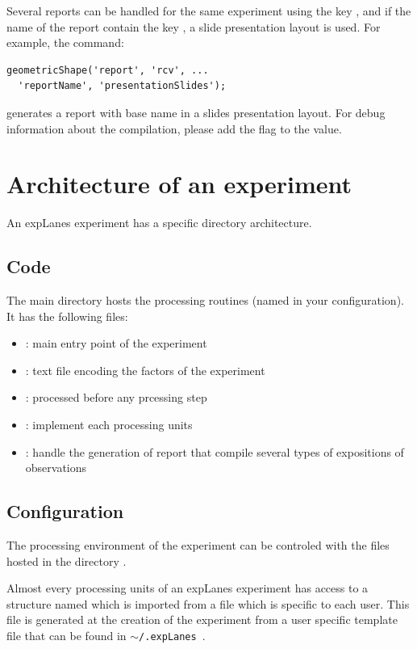 \documentclass[a4paper,fleqn]{tufte-handout}
\newcommand{\explanes}{\textsf{expLanes} }
\begin{document}
Several reports can be handled for the same experiment using the key , and if the name of the report contain the key , a slide presentation layout is used. For example, the command:
\begin{lstlisting}
geometricShape('report', 'rcv', ...
  'reportName', 'presentationSlides');
\end{lstlisting} 
generates a report with base name  in a slides presentation layout. For debug information about the compilation, please add the  flag to the  value.


\section{Architecture of an experiment}

An \explanes experiment has a specific directory architecture. 

\subsection{Code}

The main directory hosts the processing routines (named  in your configuration). It has the following files:
\begin{itemize}
\item {}: main entry point of the experiment
\item {}: text file encoding the factors of the experiment
\item {}: processed before any prcessing step
\item {}: implement each processing units
\item {}: handle the generation of report that compile several types of expositions of observations
\end{itemize}

\subsection{Configuration}

The processing environment of the experiment can be controled with the files hosted in the directory .

Almost every processing units of an \explanes experiment has access to a structure named  which is imported from a file which is specific to each user. This file is generated at the creation of the experiment from a user specific template file that can be found in \texttt{$\sim$/.\explanes}.
\end{document}
